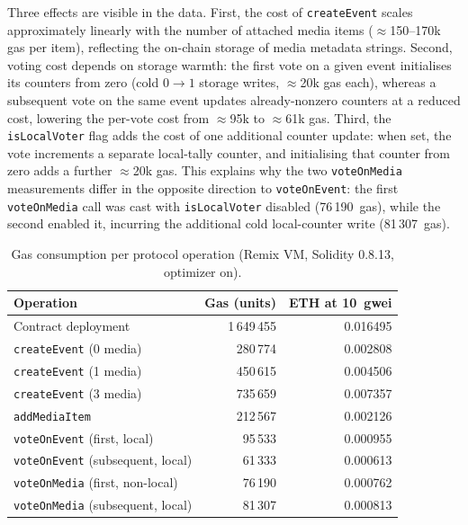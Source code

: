 \documentclass[11pt]{article}
\begin{document}
Three effects are visible in the data. First, the cost of \texttt{createEvent}
scales approximately linearly with the number of attached media items
($\approx$150--170k gas per item), reflecting the on-chain storage of media
metadata strings. Second, voting cost depends on storage warmth: the first vote
on a given event initialises its counters from zero (cold
$0\rightarrow1$ storage writes, $\approx$20k gas each), whereas a subsequent
vote on the same event updates already-nonzero counters at a reduced cost,
lowering the per-vote cost from $\approx$95k to $\approx$61k gas. Third, the
\texttt{isLocalVoter} flag adds the cost of one additional counter update: when
set, the vote increments a separate local-tally counter, and initialising that
counter from zero adds a further $\approx$20k gas. This explains why the two
\texttt{voteOnMedia} measurements differ in the opposite direction to
\texttt{voteOnEvent}: the first \texttt{voteOnMedia} call was cast with
\texttt{isLocalVoter} disabled (76\,190~gas), while the second enabled it,
incurring the additional cold local-counter write (81\,307~gas).

\begin{table}[ht]
\centering
\small
\caption{Gas consumption per protocol operation (Remix VM, Solidity 0.8.13, optimizer on).}%
\label{tab:gas}
\begin{tabular}{lrr}
\toprule
Operation & Gas (units) & ETH at 10~gwei \\
\midrule
Contract deployment                       & 1\,649\,455 & 0.016495 \\
\texttt{createEvent} (0 media)            &   280\,774 & 0.002808 \\
\texttt{createEvent} (1 media)            &   450\,615 & 0.004506 \\
\texttt{createEvent} (3 media)            &   735\,659 & 0.007357 \\
\texttt{addMediaItem}                     &   212\,567 & 0.002126 \\
\texttt{voteOnEvent} (first, local)       &    95\,533 & 0.000955 \\
\texttt{voteOnEvent} (subsequent, local)  &    61\,333 & 0.000613 \\
\texttt{voteOnMedia} (first, non-local)   &    76\,190 & 0.000762 \\
\texttt{voteOnMedia} (subsequent, local)  &    81\,307 & 0.000813 \\
\bottomrule
\end{tabular}
\end{table}
\end{document}
